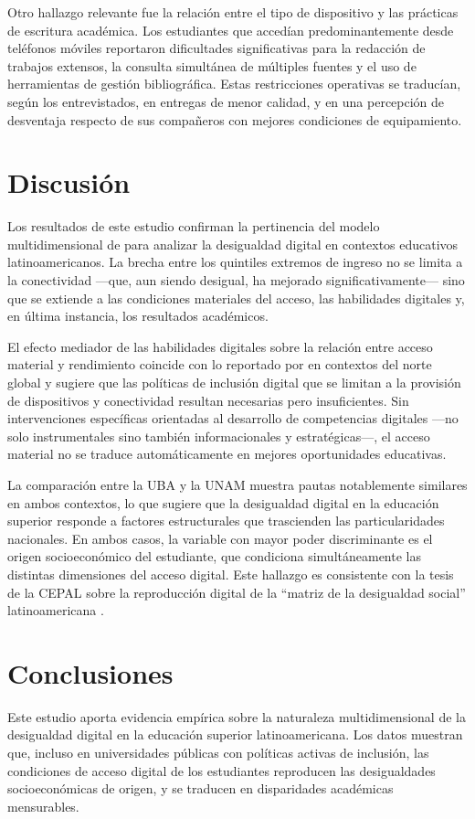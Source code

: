 Otro hallazgo relevante fue la relación entre el tipo de dispositivo y las prácticas de escritura académica. Los estudiantes que accedían predominantemente desde teléfonos móviles reportaron dificultades significativas para la redacción de trabajos extensos, la consulta simultánea de múltiples fuentes y el uso de herramientas de gestión bibliográfica. Estas restricciones operativas se traducían, según los entrevistados, en entregas de menor calidad, y en una percepción de desventaja respecto de sus compañeros con mejores condiciones de equipamiento.


\section{Discusión}
Los resultados de este estudio confirman la pertinencia del modelo multidimensional de \textcite{2563-VANDIJK2020} para analizar la desigualdad digital en contextos educativos latinoamericanos. La brecha entre los quintiles extremos de ingreso no se limita a la conectividad —que, aun siendo desigual, ha mejorado significativamente— sino que se extiende a las condiciones materiales del acceso, las habilidades digitales y, en última instancia, los resultados académicos.

El efecto mediador de las habilidades digitales sobre la relación entre acceso material y rendimiento coincide con lo reportado por \textcite{2565-HARGITTAI2002} en contextos del norte global y sugiere que las políticas de inclusión digital que se limitan a la provisión de dispositivos y conectividad resultan necesarias pero insuficientes. Sin intervenciones específicas orientadas al desarrollo de competencias digitales —no solo instrumentales sino también informacionales y estratégicas—, el acceso material no se traduce automáticamente en mejores oportunidades educativas.

La comparación entre la UBA y la UNAM muestra pautas notablemente similares en ambos contextos, lo que sugiere que la desigualdad digital en la educación superior responde a factores estructurales que trascienden las particularidades nacionales. En ambos casos, la variable con mayor poder discriminante es el origen socioeconómico del estudiante, que condiciona simultáneamente las distintas dimensiones del acceso digital. Este hallazgo es consistente con la tesis de la CEPAL sobre la reproducción digital de la “matriz de la desigualdad social” latinoamericana \autocite{2566-CEPAL2021}.


\section{Conclusiones}
Este estudio aporta evidencia empírica sobre la naturaleza multidimensional de la desigualdad digital en la educación superior latinoamericana. Los datos muestran que, incluso en universidades públicas con políticas activas de inclusión, las condiciones de acceso digital de los estudiantes reproducen las desigualdades socioeconómicas de origen, y se traducen en disparidades académicas mensurables.

